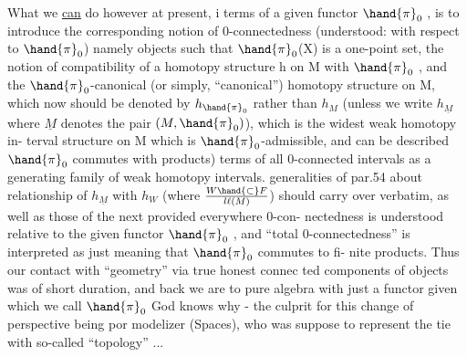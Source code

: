 
What we \uline{can} do however at present,  i terms of a given functor $\hand{\pi}_0$ ,
is to introduce the corresponding notion of 0-connectedness (understood:
with  respect to $\hand{\pi}_0$)  namely objects such that $\hand{\pi}_0$(X) is a one-point set,
the notion of compatibility of a homotopy structure h on M with $\hand{\pi}_0$ ,
and the $\hand{\pi}_0$-canonical (or simply, ``canonical'') homotopy structure on M,
which now should be denoted by  $h_{\hand{\pi}_0}$  rather than $h_M$  (unless we write $h_{\underline{M}}$
where $\underline{M}$  denotes the pair $(M,\hand{\pi}_0)$), which is the widest weak homotopy in-%
terval structure on M which is $\hand{\pi}_0$-admissible,  and can be described 
$\hand{\pi}_0$ commutes with  products)  terms of all 0-connected intervals as a
generating family of weak homotopy intervals.   generalities of par.54
about relationship of $h_{\underline{M}}$ with $h_W$  (where $W\hand{\subset} F\over{l}{\ell}(M)$)  should carry over
verbatim,  as well as those of the next  provided everywhere  0-con-%
nectedness is understood relative to the given functor $\hand{\pi}_0$ ,  and ``total
0-connectedness''  is interpreted as just meaning that $\hand{\pi}_0$ commutes to fi-%
nite products.  Thus our contact with ``geometry'' via true honest connec\hand{-}%
ted components of objects was of short duration,  and back we are to pure
algebra with just a functor given which we call $\hand{\pi}_0$ God knows why  -  the
culprit for this change of perspective being por modelizer (Spaces),
who was suppose to represent the tie with so-called ``topology'' ...

